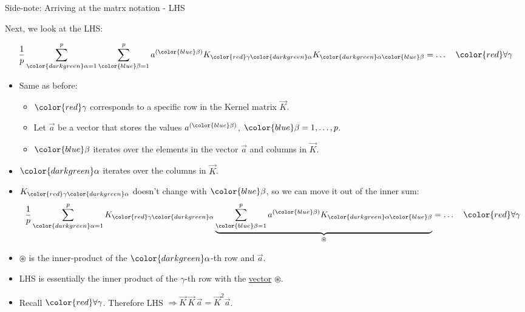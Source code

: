 
\begin{frame}{Side-note: Arriving at the matrx notation - LHS}

Next, we look at the LHS:

\svspace{-3mm}

\begin{equation}
 \frac{1}{p} \sum_{{\color{darkgreen}\alpha=1}}^{p} \sum^{p}_{{\color{blue}\beta=1}} 
a^{({\color{blue}\beta})}
K_{{\color{red}\gamma} {\color{darkgreen}\alpha}}
K_{{\color{darkgreen}\alpha} {\color{blue}\beta}} = \ldots
 \quad {\color{red}\forall \gamma}
\end{equation}

\svspace{-1mm}

\begin{itemize}
\item Same as before:
\begin{itemize}
\item ${\color{red}\gamma}$ corresponds to a specific row in the Kernel matrix $\vec K$.
\item Let $\vec a$ be a vector that stores the values $a^{({\color{blue}\beta})}$, ${\color{blue}\beta=1,\ldots,p}$.
\item ${\color{blue}\beta}$ iterates over the elements in the vector $\vec a$ and columns in $\vec K$.
\end{itemize}
\item ${\color{darkgreen}\alpha}$ iterates over the columns in $\vec K$.
\item $K_{{\color{red}\gamma} {\color{darkgreen}\alpha}}$ doesn't change with ${\color{blue}\beta}$, so we can move it out of the inner sum:
\svspace{-3mm}
\begin{align}
 \frac{1}{p} \sum_{{\color{darkgreen}\alpha=1}}^{p} 
 K_{{\color{red}\gamma} {\color{darkgreen}\alpha}}
 \underbrace{
\sum^{p}_{{\color{blue}\beta=1}} 
a^{({\color{blue}\beta})}
K_{{\color{darkgreen}\alpha} {\color{blue}\beta}}}_{\circledast} = \ldots
 \quad {\color{red}\forall \gamma}
\end{align}
\item $\circledast$ is the inner-product of the ${\color{darkgreen}\alpha}$-th row and $\vec a$.
\item LHS is essentially the inner product of the $\gamma$-th row with the \underline{vector} $\circledast$.
\item Recall ${\color{red}\forall \gamma}$. Therefore LHS $\Rightarrow \vec K \, \vec K \, \vec a = \vec K^2 \vec a$.  

\end{itemize}

\end{frame}


